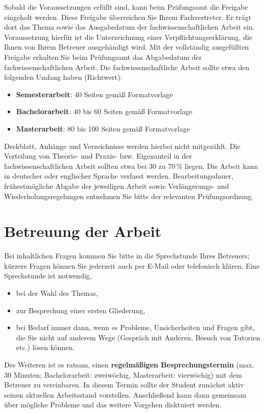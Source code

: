 Sobald die Voraussetzungen erfüllt sind, kann beim Prüfungsamt die Freigabe eingeholt werden. Diese Freigabe überreichen Sie Ihrem Fachvertreter. Er trägt dort das Thema sowie das Ausgabedatum der fachwissenschaftlichen Arbeit ein. Voraussetzung hierfür ist die Unterzeichnung einer Verpflichtungserklärung, die Ihnen von Ihrem Betreuer ausgehändigt wird. Mit der vollständig ausgefüllten Freigabe erhalten Sie beim Prüfungsamt das Abgabedatum der fachwissenschaftlichen Arbeit. Die fachwissenschaftliche Arbeit sollte etwa den folgenden Umfang haben (Richtwert):
\begin{itemize}
	\item \textbf{Semesterarbeit}: 40 Seiten gemäß Formatvorlage
	\item \textbf{Bachelorarbeit}: 40 bis 60 Seiten gemäß Formatvorlage
	\item \textbf{Masterarbeit}: 80 bis 100 Seiten gemäß Formatvorlage 
\end{itemize}
Deckblatt, Anhänge und Verzeichnisse werden hierbei nicht mitgezählt. Die Verteilung von Theorie- und Praxis- bzw. Eigenanteil in der fachwissenschaftlichen Arbeit sollten etwa bei 30 zu 70\,\% liegen. Die Arbeit kann in deutscher oder englischer Sprache verfasst werden. Bearbeitungsdauer, frühestmögliche Abgabe der jeweiligen Arbeit sowie Verlängerungs- und Wiederholungsregelungen entnehmen Sie bitte der relevanten Prüfungsordnung.


\section{Betreuung der Arbeit}
\label{sec:Betreuung der Arbeit}

Bei inhaltlichen Fragen kommen Sie bitte in die Sprechstunde Ihres Betreuers; kürzere Fragen können Sie jederzeit auch per E-Mail oder telefonisch klären.
Eine Sprechstunde ist notwendig,
\begin{itemize}
	\item bei der Wahl des Themas,
	\item zur Besprechung einer ersten Gliederung,
	\item bei Bedarf immer dann, wenn es Probleme, Unsicherheiten und Fragen gibt, die Sie nicht auf anderem Wege (Gespräch mit Anderen, Besuch von Tutorien etc.) lösen können.
\end{itemize}
Des Weiteren ist es ratsam, einen \textbf{regelmäßigen Besprechungstermin} (max. 30 Minuten; Bachelorarbeit: zweiwöchig, Masterarbeit: vierwöchig) mit dem Betreuer zu vereinbaren. In diesem Termin sollte der Student zunächst aktiv seinen aktuellen Arbeitsstand vorstellen. Anschließend kann dann gemeinsam über mögliche Probleme und das weitere Vorgehen disktuiert werden.


